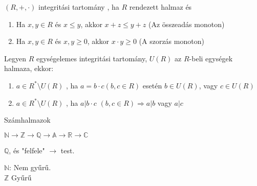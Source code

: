 \begin{frame}
  \begin{tcolorbox}[title={Def.: Rendezett Integritási Tartomány}]
    $(R, +, {\cdot})$ integritási tartomány , ha $R$ rendezett halmaz és\\
    \begin{enumerate}
      \item Ha $x, y \in R$ és $x \leq y$, akkor $x + z \leq y + z$ (Az összeadás monoton)
      \item Ha $x, y \in R$ és $x, y \geq 0$, akkor $x \cdot y \geq 0$ (A szorzás monoton)
    \end{enumerate}
  \end{tcolorbox}

  \begin{tcolorbox}[title={Def.: Felbonthatatlan, Prím}]
    Legyen $R$ egységelemes integritási tartomány, $U(R)$ az $R$-beli egységek halmaza, ekkor:\\
    \begin{enumerate}
      \item $a \in R^* \setminus U(R)$ , ha $a = b \cdot c (b, c \in R)$ esetén $b \in U(R)$, vagy $c \in U(R)$
      \item $a \in R^* \setminus U(R)$ , ha $a | b \cdot c$ $(b, c \in R) \Rightarrow a|b$ vagy $a|c$
    \end{enumerate}
  \end{tcolorbox}
\end{frame}



\begin{frame}[plain]
\begin{tcolorbox}[center, colback={myyellow}, coltext={black}, colframe={myyellow}]
    {\RHuge Számhalmazok}
    \mmedskip
\end{tcolorbox}
\end{frame}

\begin{frame}
  \begin{tcolorbox}
    $\mathbb{N} \rightarrow \mathbb{Z} \rightarrow \mathbb{Q} \rightarrow \mathbb{A} \rightarrow \mathbb{R} \rightarrow \mathbb{C}$\\
    \msmallskip
    
    $\mathbb{Q}$, és "felfele" $\rightarrow$ test.
    \mmedskip
    
    $\mathbb{N}$: Nem gyűrű.\\
    $\mathbb{Z}$ Gyűrű\\
  \end{tcolorbox}
\end{frame}


